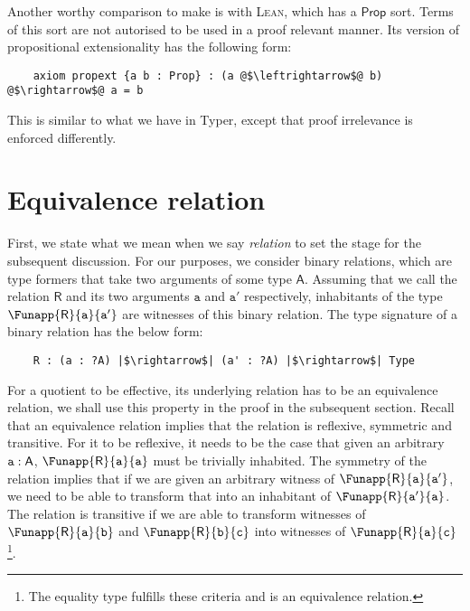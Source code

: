 \documentclass[12pt,twoside,maitrise]{dms}
\theoremstyle{definition}
\numberwithin{equation}{section}
\numberwithin{table}{chapter}
\numberwithin{figure}{chapter}
\newcommand\kw[1] {\textsf{#1}}
\newcommand\id[1] {\texttt{#1}}
\def\Lean{\textsc{Lean}\xspace}
\begin{document}
Another worthy comparison to make is with \Lean{}, which has a $\kw{Prop}$ sort.
Terms of this sort are not autorised to be used in a proof relevant manner. Its
version of propositional extensionality has the following form:

\begin{verbatim}
    axiom propext {a b : Prop} : (a @$\leftrightarrow$@ b) @$\rightarrow$@ a = b
\end{verbatim}

This is similar to what we have in Typer, except that proof irrelevance is
enforced differently.

\section{Equivalence relation}

First, we state what we mean when we say \emph{relation} to set the stage for
the subsequent discussion. For our purposes, we consider binary relations, which
are type formers that take two arguments of some type $\kw{A}$. Assuming that we
call the relation $\kw{R}$ and its two arguments $\id{a}$ and $\id{a}'$
respectively, inhabitants of the type $\Funapp{\kw{R}}{\id{a}}{\id{a}'}$ are
witnesses of this binary relation. The type signature of a binary relation has
the below form:

\begin{verbatim}
    R : (a : ?A) |$\rightarrow$| (a' : ?A) |$\rightarrow$| Type
\end{verbatim}

For a quotient to be effective, its underlying relation has to be an equivalence
relation, we shall use this property in the proof in the subsequent section.
Recall that an equivalence relation implies that the relation is reflexive,
symmetric and transitive. For it to be reflexive, it needs to be the case that
given an arbitrary $\oftype{\id{a}}{\kw{A}}$, $\Funapp{\kw{R}}{\id{a}}{\id{a}}$
must be trivially inhabited. The symmetry of the relation implies that if we are
given an arbitrary witness of $\Funapp{\kw{R}}{\id{a}}{\id{a}'}$, we need to be
able to transform that into an inhabitant of $\Funapp{\kw{R}}{\id{a}'}{\id{a}}$.
The relation is transitive if we are able to transform witnesses of
$\Funapp{\kw{R}}{\id{a}}{\id{b}}$ and $\Funapp{\kw{R}}{\id{b}}{\id{c}}$ into
witnesses of $\Funapp{\kw{R}}{\id{a}}{\id{c}}$\footnote{The equality type
fulfills these criteria and is an equivalence relation.}.
\end{document}
